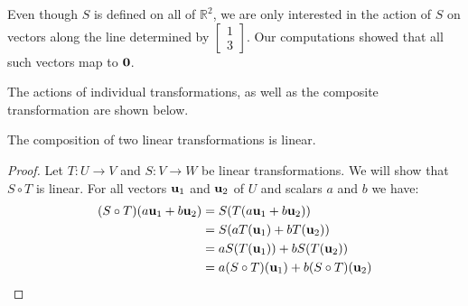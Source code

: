 \documentclass{ximera}
\renewcommand{\vec}[1]{{\bf #1}}
\newcommand{\RR}{\mathbb{R}}
\begin{document}
\begin{example}
\begin{explanation}
Even though $S$ is defined on all of $\RR^2$, we are only interested in the action of $S$ on vectors along the line determined by $\begin{bmatrix}1\\3\end{bmatrix}$.  Our computations showed that all such vectors map to $\vec{0}$.

The actions of individual transformations, as well as the composite transformation are shown below.

\begin{image}[3.5in]\label{fig:actionofst} 
\centering
{}
  
\end{image}

\end{explanation}
\end{example}

\begin{theorem}\label{th:complinear}
The composition of two linear transformations is linear.
\end{theorem}
\begin{proof}
Let $T:U\rightarrow V$ and $S:V\rightarrow W$ be linear transformations. We will show that $S\circ T$ is linear.  For all vectors $\vec{u}_1$ and $\vec{u}_2$ of $U$ and scalars $a$ and $b$ we have:
\begin{align*}
(S\circ T)(a\vec{u}_1+b\vec{u}_2)&=S(T(a\vec{u}_1+b\vec{u}_2))\\
&=S(aT(\vec{u}_1)+bT(\vec{u}_2))\\
&=aS(T(\vec{u}_1))+bS(T(\vec{u}_2))\\
&=a(S\circ T)(\vec{u}_1)+b(S\circ T)(\vec{u}_2)
\end{align*}
\end{proof}
\end{document}
